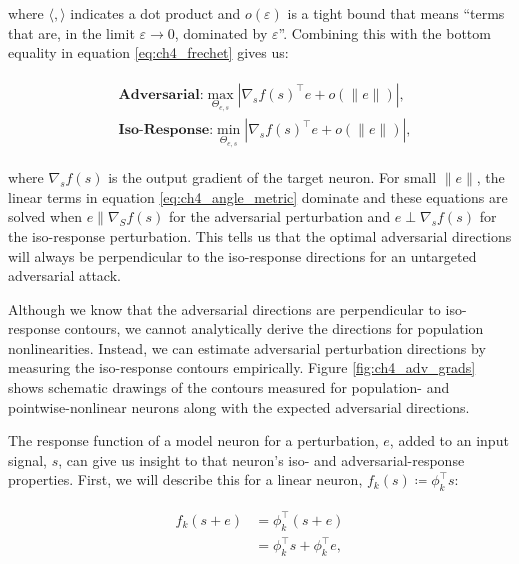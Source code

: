 where $\langle , \rangle$ indicates a dot product and $o(\varepsilon)$ is a tight bound that means ``terms that are, in the limit $\varepsilon \rightarrow 0$, dominated by $\varepsilon$''. Combining this with the bottom equality in equation \eqref{eq:ch4_frechet} gives us:

\begin{align}\label{eq:ch4_angle_metric}
\begin{split}
    &\textbf{Adversarial:} \max_{\Theta_{e,s}} |\nabla_{s}f(s)^\top e + o(\|e\|)|,\\
    &\textbf{Iso-Response:} \min_{\Theta_{e,s}} |\nabla_{s}f(s)^\top e + o(\|e\|)|,
\end{split}
\end{align}

where $\nabla_{s}f(s)$ is the output gradient of the target neuron. For small $\|e\|$, the linear terms in equation \eqref{eq:ch4_angle_metric} dominate and these equations are solved when $e \parallel \nabla_{S}f(s)$ for the adversarial perturbation and $e \perp \nabla_{s}f(s)$ for the iso-response perturbation. This tells us that the optimal adversarial directions will always be perpendicular to the iso-response directions for an untargeted adversarial attack. 

Although we know that the adversarial directions are perpendicular to iso-response contours, we cannot analytically derive the directions for population nonlinearities. Instead, we can estimate adversarial perturbation directions by measuring the iso-response contours empirically. Figure \ref{fig:ch4_adv_grads} shows schematic drawings of the contours measured for population- and pointwise-nonlinear neurons along with the expected adversarial directions.

The response function of a model neuron for a perturbation, $e$, added to an input signal, $s$, can give us insight to that neuron's iso- and adversarial-response properties. First, we will describe this for a linear neuron, $f_{k}(s) \coloneqq \phi_{k}^\top s$:

\begin{align}\label{eq:ch4_linear_neuron}
\begin{split}
    f_{k}(s+e) &= \phi_{k}^\top (s + e) \\
    &= \phi_{k}^\top s +\phi_{k}^\top e,
\end{split}
\end{align}

